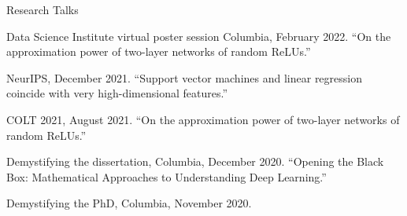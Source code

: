 \documentclass{resume} %
\begin{document}
\begin{rSection}{Research Talks}
\begin{rSubsection}{}{}{}
\item  Data Science Institute virtual poster session Columbia, February 2022. ``On the approximation power of two-layer networks of random ReLUs.''
\item  NeurIPS, December 2021. ``Support vector machines and linear regression coincide with very high-dimensional features.''
\item COLT 2021, August 2021.  ``On the approximation power of two-layer networks of random ReLUs.''
\item Demystifying the dissertation, Columbia, December 2020. ``Opening the Black Box: Mathematical Approaches to Understanding Deep Learning.''
\item Demystifying the PhD, Columbia, November 2020. 

\end{rSubsection}
\end{rSection}
\end{document}
